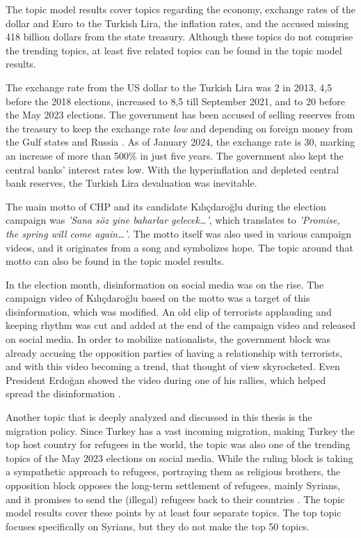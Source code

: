 The topic model results cover topics regarding the economy, exchange rates of the dollar and Euro to the 
Turkish Lira, the inflation rates, and the accused missing 418 billion dollars from the state treasury. 
Although these topics do not comprise the trending topics, at least five related topics can be found in the 
topic model results.

The exchange rate from the US dollar to the Turkish Lira was 2 in 2013, 4,5 before the 2018 elections, 
increased to 8,5 till September 2021, and to 20 before the May 2023 elections. The government has been accused 
of selling reserves from the treasury to keep the exchange rate \textit{low} and depending on foreign money from the 
Gulf states and Russia \parencite{edgar_sar_opposition_election_agenda_2023}. As of January 2024, the exchange 
rate is 30, marking an increase of more than 500\% in just five years.
The government also kept the central banks' interest rates low. With the hyperinflation and depleted 
central bank reserves, the Turkish Lira devaluation was inevitable.

The main motto of CHP and its candidate Kılıçdaroğlu during the election campaign 
was \textit{'Sana söz yine baharlar gelecek\ldots'}, which translates to 
\textit{'Promise, the spring will come again\ldots'}. 
The motto itself was also used in various campaign videos, and it originates from a song and symbolizes 
hope. The topic around that motto can also be found in the topic model results.

In the election month, disinformation on social media was on the rise. The campaign video of Kılıçdaroğlu 
based on the motto was a target of this disinformation, which was modified. An old clip of terrorists 
applauding and keeping rhythm was cut and added at the end of the campaign video and released on social 
media. In order to mobilize nationalists, the government block was already accusing the opposition parties 
of having a relationship with terrorists, and with this video becoming a trend, that thought of view 
skyrocketed. Even President Erdoğan showed the video during one of his rallies, which helped spread the 
disinformation \parencite{ogras_disinformation_chp_pkk_2024}.

Another topic that is deeply analyzed and discussed in this thesis is the migration policy. Since Turkey has 
a vast incoming migration, making Turkey the top host country for refugees in the world, the topic was also 
one of the trending topics of the May 2023 elections on social media. While the ruling block is taking a 
sympathetic approach to refugees, portraying them as religious brothers, the opposition block opposes the 
long-term settlement of refugees, mainly Syrians, and it promises to send the (illegal) refugees back to 
their countries \parencite{berk_esen_turkish_politics_2023}. The topic model results cover these points 
by at least four separate topics. The top topic focuses specifically on Syrians, but they do not make 
the top 50 topics.

